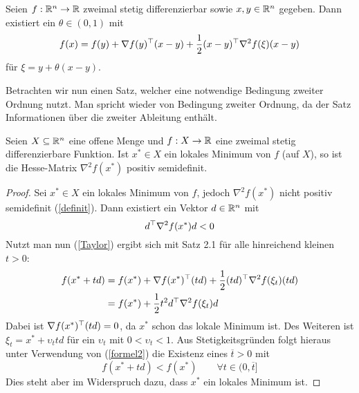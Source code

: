 \begin{erinnerung}
	Seien $f : \mathbb{R}^{n} \to \mathbb{R}$ zweimal stetig differenzierbar sowie $x,y \in \mathbb{R}^{n}$ gegeben. Dann existiert ein $\theta \in (0,1)$ mit 
	\begin{equation}
		f(x) = f(y) + \nabla f(y)^{\top}(x-y)+\dfrac{1}{2}(x-y)^{\top} \nabla^{2} f(\xi)(x-y)
		\label{Taylor}
	\end{equation}
	für $\xi = y+\theta(x-y)$.
\end{erinnerung}

Betrachten wir nun einen Satz, welcher eine notwendige Bedingung zweiter Ordnung nutzt. Man spricht wieder von Bedingung zweiter Ordnung, da der Satz Informationen über die zweiter Ableitung enthält.

\begin{satz} \label{satz 1.7_2.5}
	Seien $ X \subseteq \mathbb{R}^n $ eine offene Menge und $ f: X \to \mathbb{R} $ eine zweimal stetig differenzierbare Funktion. Ist  $ x^\ast \in X $ ein lokales Minimum von $f$ (auf $X$), so ist die Hesse-Matrix $\nabla^{2} f(x^\ast)$ positiv semidefinit.
\end{satz}
\begin{proof}
	Sei $x^\ast \in X$ ein lokales Minimum von $f$, jedoch $\nabla^{2}f(x^\ast)$ nicht positiv semidefinit (\ref{definit}). Dann existiert ein Vektor $d \in \mathbb{R}^{n}$ mit 
	\begin{equation}
		d^{\top} \nabla^{2} f(x^\ast) d < 0
		\label{formel2}
	\end{equation}
	Nutzt man nun (\ref{Taylor}) ergibt sich mit Satz 2.1 für alle hinreichend kleinen $t>0$:
	\begin{equation*}
	\begin{split}
		f(x^\ast+td)  &= f(x^\ast) + \nabla f(x^\ast)^{\top}(td) + \dfrac{1}{2}(td)^{\top} \nabla^{2} f(\xi_{t})(td) \\
		&= f(x^\ast) + \dfrac{1}{2}t^{2}d^{\top} \nabla^{2} f(\xi_{t})d 
		\end{split}
	\end{equation*}
	Dabei ist $\nabla f(x^\ast)^{\top}(td) = 0$, da $x^\ast$ schon das lokale Minimum ist. Des Weiteren ist $\xi_{t} = x^\ast + \upsilon_{t}td$ für ein $\upsilon_{t}$ mit $0 < \upsilon_{t} < 1$. Aus Stetigkeitsgründen folgt hieraus unter Verwendung von (\ref{formel2}) die Existenz eines $\overline{t} > 0$ mit 
	\begin{equation*}
		f(x^\ast+td)<f(x^\ast) \qquad \forall t \in (0,\overline{t}]
	\end{equation*}
	Dies steht aber im Widerspruch dazu, dass $x^\ast$ ein lokales Minimum ist.
\end{proof}

